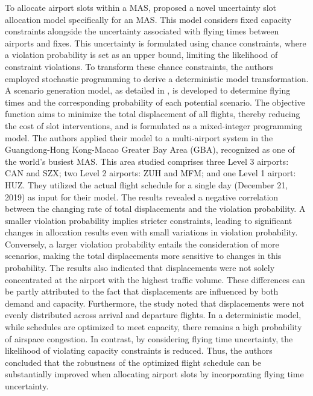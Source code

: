 To allocate airport slots within a \acrfull{MAS},  proposed a novel uncertainty slot allocation model specifically for an \acrshort{MAS}.
%
This model considers fixed capacity constraints alongside the uncertainty associated with flying times between airports and fixes.
%
This uncertainty is formulated using chance constraints, where a violation probability is set as an upper bound, limiting the likelihood of constraint violations.
%
To transform these chance constraints, the authors employed stochastic programming to derive a deterministic model transformation.
%
A scenario generation model, as detailed in , is developed to determine flying times and the corresponding probability of each potential scenario.
%
The objective function aims to minimize the total displacement of all flights, thereby reducing the cost of slot interventions, and is formulated as a mixed-integer programming model.
%
The authors applied their model to a multi-airport system in the Guangdong-Hong Kong-Macao Greater Bay Area (GBA), recognized as one of the world's busiest \acrshort{MAS}.
%
This area studied comprises three Level 3 airports: \acrfull{CAN} and \acrfull{SZX}; two Level 2 airports: \acrfull{ZUH} and \acrfull{MFM}; and one Level 1 airport: \acrfull{HUZ}.
%
They utilized the actual flight schedule for a single day (December 21, 2019) as input for their model.
%
The results revealed a negative correlation between the changing rate of total displacements and the violation probability.
%
A smaller violation probability implies stricter constraints, leading to significant changes in allocation results even with small variations in violation probability.
%
Conversely, a larger violation probability entails the consideration of more scenarios, making the total displacements more sensitive to changes in this probability.
%
The results also indicated that displacements were not solely concentrated at the airport with the highest traffic volume.
%
These differences can be partly attributed to the fact that displacements are influenced by both demand and capacity.
%
Furthermore, the study noted that displacements were not evenly distributed across arrival and departure flights.
%
In a deterministic model, while schedules are optimized to meet capacity, there remains a high probability of airspace congestion.
%
In contrast, by considering flying time uncertainty, the likelihood of violating capacity constraints is reduced.
%
Thus, the authors concluded that the robustness of the optimized flight schedule can be substantially improved when allocating airport slots by incorporating flying time uncertainty.




